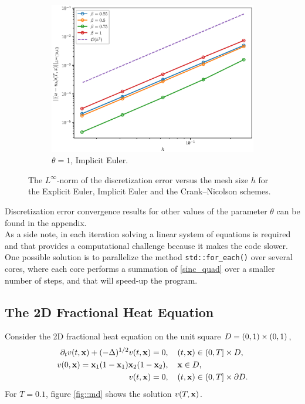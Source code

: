 \begin{figure}[h]
\begin{subfigure}{0.5\textwidth}
  \includegraphics[width=\linewidth]{figures/theta1/linf.eps}
  \caption{$\theta = 1$, Implicit Euler.}
  \label{fig:sub2}
\end{subfigure}
\caption{The $L^{\infty}$-norm of the discretization error versus the mesh size $h$ for the Explicit Euler, Implicit Euler and the Crank--Nicolson schemes. }
\label{fig:sub2}
\end{figure}
Discretization error convergence results for other values of the parameter $\theta$ can be found in the appendix. \\
As a side note, in each iteration solving a linear system of equations is required and that provides a computational challenge because it makes the code slower. One possible solution is to parallelize the method \lstinline{std::for_each()} over several cores, where each core performs a summation of \eqref{sinc_quad} over a smaller number of steps, and that will speed-up the program.
\newpage
\subsection{The 2D Fractional Heat Equation}
Consider the 2D fractional heat equation on the unit square $D=(0,1)\times(0,1)$,
\begin{equation} \label{frac_heat_2D}
\begin{split} %
\partial_tv(t,\vx) + (-\Delta)^{1/2} v(t,\vx) = 0&, \quad  (t,\vx)\in(0,T]\times\truncdom, \\
v(0,\vx) = \vx_1(1-\vx_1)\vx_2(1-\vx_2)&, \quad \vx\in \truncdom, \\ 
v(t,\vx) = 0&, \quad (t,\vx) \in (0,T]\times\partial D.
\end{split}
\end{equation}
For $T=0.1$, figure \eqref{fig::md} shows the solution $v(T,\mathbf{x})$.

